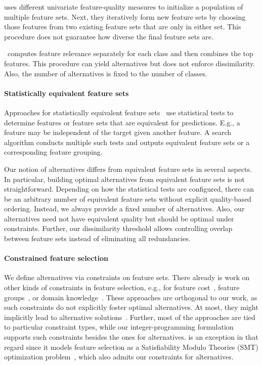 \documentclass{article}
\theoremstyle{definition}
\begin{document}
\cite{shekar2017diverse} uses different univariate feature-quality measures to initialize a population of multiple feature sets.
Next, they iteratively form new feature sets by choosing those features from two existing feature sets that are only in either set.
This procedure does not guarantee how diverse the final feature sets are.

\cite{guru2018alternative}~computes feature relevance separately for each class and then combines the top features.
This procedure can yield alternatives but does not enforce dissimilarity.
Also, the number of alternatives is fixed to the number of classes.

\paragraph{Statistically equivalent feature sets}

Approaches for statistically equivalent feature sets~\cite{borboudakis2021extending, lagani2017feature} use statistical tests to determine features or feature sets that are equivalent for predictions.
E.g., a feature may be independent of the target given another feature.
A search algorithm conducts multiple such tests and outputs equivalent feature sets or a corresponding feature grouping.

Our notion of alternatives differs from equivalent feature sets in several aspects.
In particular, building optimal alternatives from equivalent feature sets is not straightforward.
Depending on how the statistical tests are configured, there can be an arbitrary number of equivalent feature sets without explicit quality-based ordering.
Instead, we always provide a fixed number of alternatives.
Also, our alternatives need not have equivalent quality but should be optimal under constraints.
Further, our dissimilarity threshold allows controlling overlap between feature sets instead of eliminating all redundancies.

\paragraph{Constrained feature selection}

We define alternatives via constraints on feature sets.
There already is work on other kinds of constraints in feature selection, e.g., for feature cost~\cite{paclik2002feature}, feature groups~\cite{yuan2006model}, or domain knowledge~\cite{bach2022empirical, groves2015toward}.
These approaches are orthogonal to our work, as such constraints do not explicitly foster optimal alternatives.
At most, they might implicitly lead to alternative solutions~\cite{bach2022empirical}.
Further, most of the approaches are tied to particular constraint types, while our integer-programming formulation supports such constraints besides the ones for alternatives.
\cite{bach2022empirical} is an exception in that regard since it models feature selection as a Satisfiability Modulo Theories (\textsc{SMT}) optimization problem~\cite{barrett2018satisfiability, nieuwenhuis2006sat}, which also admits our constraints for alternatives.
\end{document}
